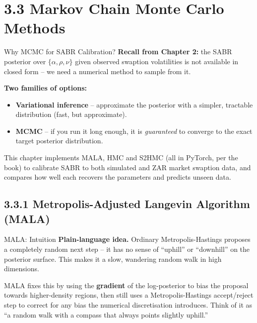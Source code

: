 \documentclass[aspectratio=169,10pt]{beamer}
\begin{document}
\section{3.3 Markov Chain Monte Carlo Methods}

\begin{frame}{Why MCMC for SABR Calibration?}
  \textbf{Recall from Chapter 2:} the SABR posterior over $\{\alpha,\rho,\nu\}$
  given observed swaption volatilities is not available in closed form -- we
  need a numerical method to sample from it.

  \vspace{2mm}
  \textbf{Two families of options:}
  \begin{itemize}
    \item \textbf{Variational inference} -- approximate the posterior with a
      simpler, tractable distribution (fast, but approximate).
    \item \textbf{MCMC} -- if you run it long enough, it is \emph{guaranteed}
      to converge to the exact target posterior distribution.
  \end{itemize}

  \vspace{2mm}
  This chapter implements MALA, HMC and S2HMC (all in PyTorch, per the book)
  to calibrate SABR to both simulated and ZAR market swaption data, and
  compares how well each recovers the parameters and predicts unseen data.
\end{frame}

\subsection{3.3.1 Metropolis-Adjusted Langevin Algorithm (MALA)}

\begin{frame}{MALA: Intuition}
  \textbf{Plain-language idea.} Ordinary Metropolis-Hastings proposes a
  completely random next step -- it has no sense of ``uphill'' or
  ``downhill'' on the posterior surface. This makes it a slow, wandering
  random walk in high dimensions.

  \vspace{2mm}
  MALA fixes this by using the \textbf{gradient} of the log-posterior to bias
  the proposal towards higher-density regions, then still uses a
  Metropolis-Hastings accept/reject step to correct for any bias the
  numerical discretisation introduces. Think of it as ``a random walk with a
  compass that always points slightly uphill.''
\end{frame}
\end{document}
